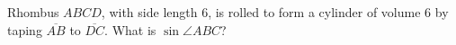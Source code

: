 Rhombus $ABCD$, with side length $6$, is rolled to form a cylinder of volume $6$ by taping $\overline{AB}$ to $\overline{DC}$. What is $\sin\angle ABC$?
